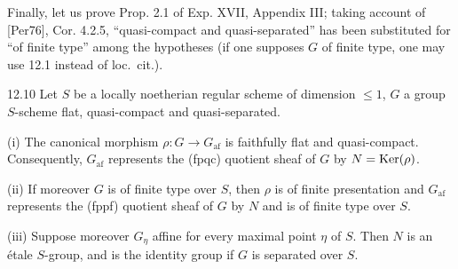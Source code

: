 Finally, let us prove Prop. 2.1 of Exp. XVII, Appendix III; taking account of [Per76], Cor. 4.2.5, ``quasi-compact and quasi-separated'' has been substituted for ``of finite type'' among the hypotheses (if one supposes $G$ of finite type, one may use 12.1 instead of loc.\ cit.).

\begin{proposition}{12.10}\label{VIB.12.10}
Let $S$ be a locally noetherian regular scheme of dimension $\leq1$, $G$ a group $S$-scheme flat, quasi-compact and quasi-separated.

(i) The canonical morphism $\rho:G\to G_{\mathrm{af}}$ is faithfully flat and quasi-compact. Consequently, $G_{\mathrm{af}}$ represents the (fpqc) quotient sheaf of $G$ by $N=\operatorname{Ker}(\rho)$.

(ii) If moreover $G$ is of finite type over $S$, then $\rho$ is of finite presentation and $G_{\mathrm{af}}$ represents the (fppf) quotient sheaf of $G$ by $N$ and is of finite type over $S$.

(iii) Suppose moreover $G_\eta$ affine for every maximal point $\eta$ of $S$. Then $N$ is an étale $S$-group, and is the identity group if $G$ is separated over $S$.
\end{proposition}
